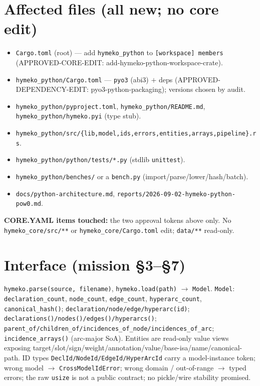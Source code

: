 \documentclass[11pt]{article}
\begin{document}
\section{Affected files (all new; no core edit)}
\begin{itemize}[nosep]
  \item \texttt{Cargo.toml} (root) --- add \texttt{hymeko\_python} to \texttt{[workspace] members}
        (APPROVED-CORE-EDIT: add-hymeko-python-workspace-crate).
  \item \texttt{hymeko\_python/Cargo.toml} --- \texttt{pyo3} (abi3) $+$ deps
        (APPROVED-DEPENDENCY-EDIT: pyo3-python-packaging); versions chosen by audit.
  \item \texttt{hymeko\_python/pyproject.toml}, \texttt{hymeko\_python/README.md},
        \texttt{hymeko\_python/hymeko.pyi} (type stub).
  \item \texttt{hymeko\_python/src/\{lib,model,ids,errors,entities,arrays,pipeline\}.rs}.
  \item \texttt{hymeko\_python/python/tests/*.py} (stdlib \texttt{unittest}).
  \item \texttt{hymeko\_python/benches/} or a \texttt{bench.py} (import/parse/lower/hash/batch).
  \item \texttt{docs/python-architecture.md}, \texttt{reports/2026-09-02-hymeko-python-pow0.md}.
\end{itemize}
\textbf{CORE.YAML items touched:} the two approval tokens above only. No
\texttt{hymeko\_core/src/**} or \texttt{hymeko\_core/Cargo.toml} edit; \texttt{data/**} read-only.

\section{Interface (mission \S3--\S7)}
\texttt{hymeko.parse(source, filename)}, \texttt{hymeko.load(path)} $\to$ \texttt{Model}.
\texttt{Model}: \texttt{declaration\_count}, \texttt{node\_count}, \texttt{edge\_count},
\texttt{hyperarc\_count}, \texttt{canonical\_hash()}; \texttt{declaration/node/edge/hyperarc(id)};
\texttt{declarations()/nodes()/edges()/hyperarcs()};
\texttt{parent\_of/children\_of/incidences\_of\_node/incidences\_of\_arc};
\texttt{incidence\_arrays()} (arc-major SoA). Entities are read-only value views exposing
target/slot/sign/weight/annotation/value/base-isa/name/canonical-path. ID types
\texttt{DeclId/NodeId/EdgeId/HyperArcId} carry a model-instance token; wrong model $\to$
\texttt{CrossModelIdError}; wrong domain / out-of-range $\to$ typed errors; the raw
\texttt{usize} is not a public contract; no pickle/wire stability promised.
\end{document}
